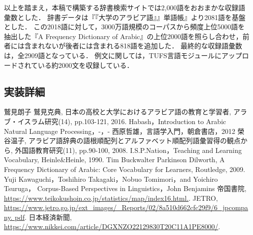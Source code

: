 \documentclass[technicalreport]{ieicej}
\begin{document}
以上を踏まえ，本稿で構築する辞書検索サイトでは2,000語をおおまかな収録語彙数とした．
辞書データは『『大学のアラビア語』』単語帳』より2081語を基盤とした．
この2018語に対して，3000万語規模のコーパスから頻度上位5000語を抽出した『A Frequency Dictionary of Arabic』の上位2000語を照らし合わせ，前者には含まれないが後者には含まれる818語を追加した．
最終的な収録語彙数は，全2909語となっている．
例文に関しては，TUFS言語モジュール\cite{kawaguchi2007}にアップロードされている約2000文を収録している．

\subsection{実装詳細}


\begin{thebibliography}{99}
鷲見朗子 鷲見克典, 日本の高校と大学におけるアラビア語の教育と学習者, アラブ・イスラム研究(14), pp.103-121, 2016.
Habash，Introduction to Arabic Natural Language Processing，-，-
西原哲雄，言語学入門，朝倉書店，2012
榮谷温子, アラビア語辞典の語根順配列とアルファベット順配列語彙習得の観点から, 外国語教育研究(11), pp.90-100, 2008.
I.S.P.Nation，Teaching and Learning Vocabulary, Heinle\&Heinle, 1990. 
Tim Buckwalter  Parkinson Dilworth, A Frequency Dictionary of Arabic: Core Vocabulary for Learners, Routledge, 2009.
Yuji Kawaguchi，Toshihiro Takagaki，Nobuo Tomimori，and Yoichiro Tsuruga，
Corpus-Based Perspectives in Linguistics，John Benjamins
帝国書院, \url{https://www.teikokushoin.co.jp/statistics/map/index16.html.}.
JETRO, \url{https://www.jetro.go.jp/ext_images/_Reports/02/8a510d662cfc29f9/6_jpcompany. pdf}.
日本経済新聞, \url{https://www.nikkei.com/article/DGXNZO22129830T20C11A1PE8000/}.
\end{thebibliography}
\end{document}
